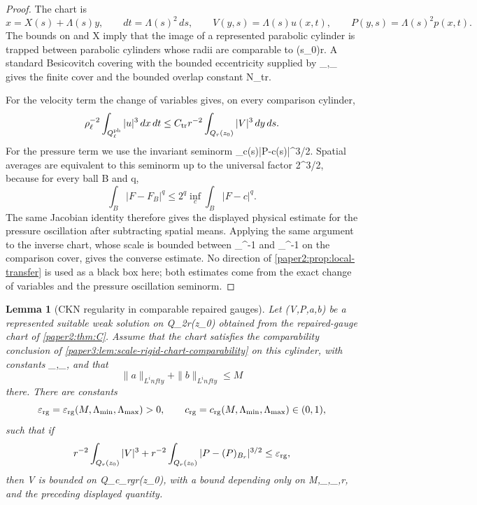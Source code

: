 \documentclass[11pt]{amsart}
\def\({}%
\def\){}%
\def\infty{infty}%
\theoremstyle{plain}
\newtheorem{lemma}[lemma]{Lemma}
\theoremstyle{definition}
\theoremstyle{remark}
\begin{document}
\begin{proof}
The chart is
\[
  x=X(s)+\Lambda(s)y,\qquad dt=\Lambda(s)^2\,ds,
  \qquad V(y,s)=\Lambda(s)u(x,t),\qquad P(y,s)=\Lambda(s)^2p(x,t).
\]
The bounds on \(\Lambda\) and \(X\) imply that the image of a represented
parabolic cylinder is trapped between parabolic cylinders whose radii are
comparable to \(\Lambda(s_0)r\).  A standard Besicovitch covering with the
bounded eccentricity supplied by
\(\Lambda_{\min},\Lambda_{\max}\) gives the finite cover and the bounded
overlap constant \(N_{\rm tr}\).

For the velocity term the change of variables gives, on every comparison
cylinder,
\[
  \rho_\ell^{-2}\int_{Q^{\rm ph}_{\ell}}|u|^3\,dx\,dt
  \le C_{\rm tr} r^{-2}\int_{Q_r(z_0)}|V|^3\,dy\,ds .
\]
For the pressure term we use the invariant seminorm
\(\inf_{c(s)}\int |P-c(s)|^{3/2}\).  Spatial averages are equivalent to this
seminorm up to the universal factor \(2^{3/2}\), because for every ball \(B\)
and \(q\),
\[
  \int_B |F-F_B|^q\le 2^q\inf_c\int_B|F-c|^q .
\]
The same Jacobian identity therefore gives the displayed physical estimate for
the pressure oscillation after subtracting spatial means.  Applying the same
argument to the inverse chart, whose scale is bounded between
\(\Lambda_{\max}^{-1}\) and \(\Lambda_{\min}^{-1}\) on the comparison cover,
gives the converse estimate.  No direction of
\cref{paper2:prop:local-transfer} is used as a black box here; both estimates
come from the exact change of variables and the pressure oscillation seminorm.
\end{proof}

\begin{lemma}[CKN regularity in comparable repaired gauges]
\label{paper3:lem:scale-rigid-ckn-in-gauge}
Let \((V,P,a,b)\) be a represented suitable weak solution on \(Q_{2r}(z_0)\)
obtained from the repaired-gauge chart of \cref{paper2:thm:C}.  Assume that the
chart satisfies the comparability conclusion of
\cref{paper3:lem:scale-rigid-chart-comparability} on this cylinder, with
constants \(\Lambda_{\min},\Lambda_{\max}\), and that
\[
  \|a\|_{L^\infty}+\|b\|_{L^\infty}\le M
\]
there.  There are constants
\[
  \varepsilon_{\rm rg}
  =\varepsilon_{\rm rg}(M,\Lambda_{\min},\Lambda_{\max})>0,
  \qquad
  c_{\rm rg}=c_{\rm rg}(M,\Lambda_{\min},\Lambda_{\max})\in(0,1),
\]
such that if
\[
  r^{-2}\int_{Q_r(z_0)} |V|^3
  +r^{-2}\int_{Q_r(z_0)} |P-(P)_{B_r}|^{3/2}
  \le\varepsilon_{\rm rg},
\]
then \(V\) is bounded on \(Q_{c_{\rm rg}r}(z_0)\), with a bound depending only
on \(M,\Lambda_{\min},\Lambda_{\max},r\), and the preceding displayed
quantity.
\end{lemma}
\end{document}
